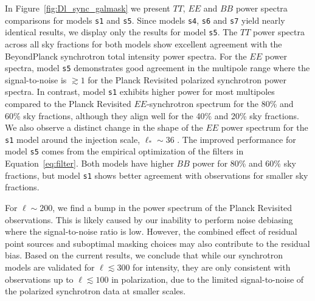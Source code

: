 \documentclass[twocolumn]{aastex631}
\begin{document}
In Figure~\ref{fig:Dl_sync_galmask} we present $TT$, $EE$ and $BB$ power spectra comparisons for models \texttt{s1} and \texttt{s5}. Since models \texttt{s4}, \texttt{s6} and \texttt{s7} yield nearly identical results, we display only the results for model \texttt{s5}. The $TT$ power spectra across all sky fractions for both models show excellent agreement with the BeyondPlanck synchrotron total intensity power spectra. For the $EE$ power spectra, model \texttt{s5} demonstrates good agreement in the multipole range where the signal-to-noise is $\gtrsim 1$ for the Planck Revisited polarized synchrotron power spectra. In contrast, model \texttt{s1} exhibits higher power for most multipoles compared to the Planck Revisited $EE$-synchrotron spectrum for the 80\% and 60\% sky fractions, although they align well for the 40\% and 20\% sky fractions. We also observe a distinct change in the shape of the $EE$ power spectrum for the \texttt{s1} model around the injection scale, $\ell_*\sim 36$ \citep{Thorne:2017}. The improved performance for model \texttt{s5} comes from the empirical optimization of the filters in Equation~\ref{eq:filter}. Both models have higher $BB$ power for 80\% and 60\% sky fractions, but model \texttt{s1} shows better agreement with observations for smaller sky fractions.

For $\ell \sim 200$, we find a bump in the power spectrum of the Planck Revisited observations. This is likely caused by our inability to perform noise debiasing where the signal-to-noise ratio is low. However, the combined effect of residual point sources and suboptimal masking choices may also contribute to the residual bias. Based on the current results, we conclude that while our synchrotron models are validated for $\ell \lesssim 300$ for intensity, they are only consistent with observations up to $\ell \lesssim 100$ in polarization, due to the limited signal-to-noise of the polarized synchrotron data at smaller scales.
\end{document}
